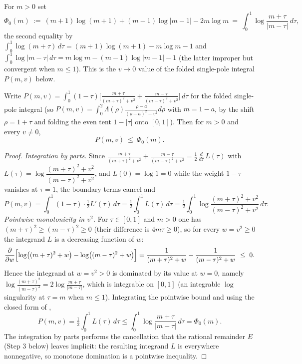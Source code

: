 \begin{definition}[The $v=0$ slice $\Phi_0$]
\label{def:lb_slice}
\leanok
For $m>0$ set
\[
  \Phi_0(m)\ :=\ (m+1)\log(m+1)+(m-1)\log|m-1|-2m\log m
  \ =\ \int_0^1\log\frac{m+\tau}{|m-\tau|}\,d\tau ,
\]
the second equality by $\int_0^1\log(m+\tau)\,d\tau=(m+1)\log(m+1)-m\log m-1$ and
$\int_0^1\log|m-\tau|\,d\tau=m\log m-(m-1)\log|m-1|-1$ (the latter improper but
convergent when $m\le1$). This is the $v\to0$ value of the folded single-pole
integral $P(m,v)$ below.
\end{definition}

\begin{lemma}
\label{lem:lb_P_le_slice}
\leanok
{}
Write $P(m,v)=\int_0^1(1-\tau)\bigl[\tfrac{m+\tau}{(m+\tau)^2+v^2}+\tfrac{m-\tau}{(m-\tau)^2+v^2}\bigr]\,d\tau$
for the folded single-pole integral (so $P(m,v)=\int_0^2\Lambda(\rho)\tfrac{\rho-a}{(\rho-a)^2+v^2}d\rho$
with $m=1-a$, by the shift $\rho=1+\tau$ and folding the even tent $1-|\tau|$ onto
$[0,1]$). Then for $m>0$ and every $v\neq0$,
\[
  P(m,v)\ \le\ \Phi_0(m).
\]
\end{lemma}

\begin{proof}
\leanok
{}
\emph{Integration by parts.} Since
$\tfrac{m+\tau}{(m+\tau)^2+v^2}+\tfrac{m-\tau}{(m-\tau)^2+v^2}
   =\tfrac12\,\tfrac{d}{d\tau}\,L(\tau)$ with
$L(\tau)=\log\dfrac{(m+\tau)^2+v^2}{(m-\tau)^2+v^2}$, and $L(0)=\log1=0$ while the
weight $1-\tau$ vanishes at $\tau=1$, the boundary terms cancel and
\[
  P(m,v)=\int_0^1(1-\tau)\cdot\tfrac12 L'(\tau)\,d\tau
        =\tfrac12\int_0^1 L(\tau)\,d\tau
        =\tfrac12\int_0^1\log\frac{(m+\tau)^2+v^2}{(m-\tau)^2+v^2}\,d\tau .
\]
\emph{Pointwise monotonicity in $v^2$.} For $\tau\in[0,1]$ and $m>0$ one has
$(m+\tau)^2\ge(m-\tau)^2\ge0$ (their difference is $4m\tau\ge0$), so for every
$w=v^2\ge0$ the integrand $L$ is a decreasing function of $w$:
\[
  \frac{\partial}{\partial w}\Bigl[\log\bigl((m+\tau)^2+w\bigr)-\log\bigl((m-\tau)^2+w\bigr)\Bigr]
  =\frac1{(m+\tau)^2+w}-\frac1{(m-\tau)^2+w}\ \le\ 0 .
\]
Hence the integrand at $w=v^2>0$ is dominated by its value at $w=0$, namely
$\log\frac{(m+\tau)^2}{(m-\tau)^2}=2\log\frac{m+\tau}{|m-\tau|}$, which is integrable
on $[0,1]$ (an integrable $\log$ singularity at $\tau=m$ when $m\le1$). Integrating
the pointwise bound and using the closed form of ,
\[
  P(m,v)=\tfrac12\int_0^1 L(\tau)\,d\tau
        \le\int_0^1\log\frac{m+\tau}{|m-\tau|}\,d\tau=\Phi_0(m).
\]
The integration by parts performs the cancellation that the rational remainder $E$
(Step 3 below) leaves implicit: the resulting integrand $L$ is everywhere
nonnegative, so monotone domination is a pointwise inequality.
\end{proof}

